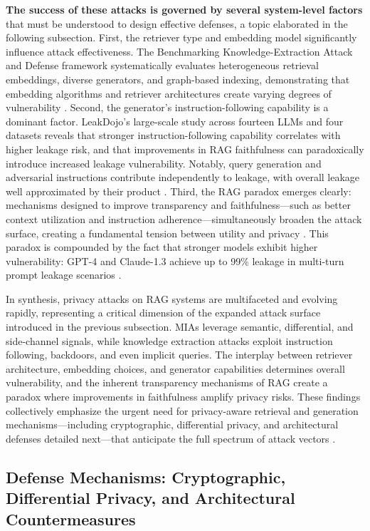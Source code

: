 \documentclass[11pt]{article}
\begin{document}
\textbf{The success of these attacks is governed by several system-level factors} that must be understood to design effective defenses, a topic elaborated in the following subsection. First, the retriever type and embedding model significantly influence attack effectiveness. The Benchmarking Knowledge-Extraction Attack and Defense framework systematically evaluates heterogeneous retrieval embeddings, diverse generators, and graph-based indexing, demonstrating that embedding algorithms and retriever architectures create varying degrees of vulnerability \cite{ref484}. Second, the generator's instruction-following capability is a dominant factor. LeakDojo's large-scale study across fourteen LLMs and four datasets reveals that stronger instruction-following capability correlates with higher leakage risk, and that improvements in RAG faithfulness can paradoxically introduce increased leakage vulnerability. Notably, query generation and adversarial instructions contribute independently to leakage, with overall leakage well approximated by their product \cite{ref466}. Third, the RAG paradox emerges clearly: mechanisms designed to improve transparency and faithfulness---such as better context utilization and instruction adherence---simultaneously broaden the attack surface, creating a fundamental tension between utility and privacy \cite{ref466,ref485}. This paradox is compounded by the fact that stronger models exhibit higher vulnerability: GPT-4 and Claude-1.3 achieve up to 99\% leakage in multi-turn prompt leakage scenarios \cite{ref486}.

In synthesis, privacy attacks on RAG systems are multifaceted and evolving rapidly, representing a critical dimension of the expanded attack surface introduced in the previous subsection. MIAs leverage semantic, differential, and side-channel signals, while knowledge extraction attacks exploit instruction following, backdoors, and even implicit queries. The interplay between retriever architecture, embedding choices, and generator capabilities determines overall vulnerability, and the inherent transparency mechanisms of RAG create a paradox where improvements in faithfulness amplify privacy risks. These findings collectively emphasize the urgent need for privacy-aware retrieval and generation mechanisms---including cryptographic, differential privacy, and architectural defenses detailed next---that anticipate the full spectrum of attack vectors \cite{ref477,ref466}.

\subsection{Defense Mechanisms: Cryptographic, Differential Privacy, and Architectural Countermeasures}
\end{document}
